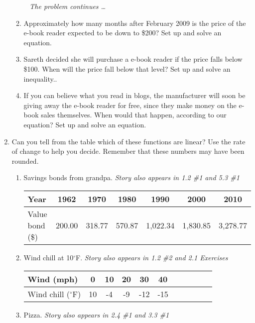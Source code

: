 \begin{enumerate}
\begin{enumerate}
\newpage %
~\hspace{-.5in} \emph{The problem continues \ldots}

\item Approximately how many months after February 2009 is the price of the e-book reader expected to be down to  \$200? Set up and solve an equation. \vfill  
\item Sareth decided she will purchase a e-book reader if the price falls below \$100.  When will the price fall below that level?  Set up and solve an inequality..  \vfill  
\item If you can believe what you read in blogs, the manufacturer will soon be giving away the e-book reader for free, since they make money on the e-book sales themselves.  When would that happen, according to our equation? Set up and solve an equation. \vfill  
\end{enumerate}

\newpage %

\item  Can you tell from the table which of these functions are linear?  Use the rate of change to help you decide.  Remember that these numbers may have been rounded.
\begin{enumerate}
\item  Savings bonds from grandpa.  \hfill \emph{Story also appears in 1.2 \#1 and 5.3 \#1} %

\bigskip
\begin{tabular} {|l|| c| c| c| c| c| c|} \hline
Year & 1962 & 1970 & 1980 & 1990 & 2000 & 2010\\ \hline
Value bond (\$) & 200.00 & 318.77 & 570.87 & 1,022.34 & 1,830.85 & 3,278.77 \\ \hline
\end{tabular}
\vfill


\item Wind chill at 10$^\circ$F.  \hfill \emph{Story also appears in 1.2  \#2 and 2.1 Exercises}

\bigskip
\begin{tabular} {|l||c|c| c|c|c| c|c|c| c|c|} \hline
Wind (mph)  & 0  & 10  & 20  & 30  & 40  \\ \hline
Wind chill ($^\circ$F) & 10  & -4 & -9 & -12  & -15  \\ \hline
\end{tabular}
\vfill

\item Pizza.  \hfill \emph{Story also appears in 2.4 \#1 and 3.3 \#1}


\end{enumerate}
\end{enumerate}
